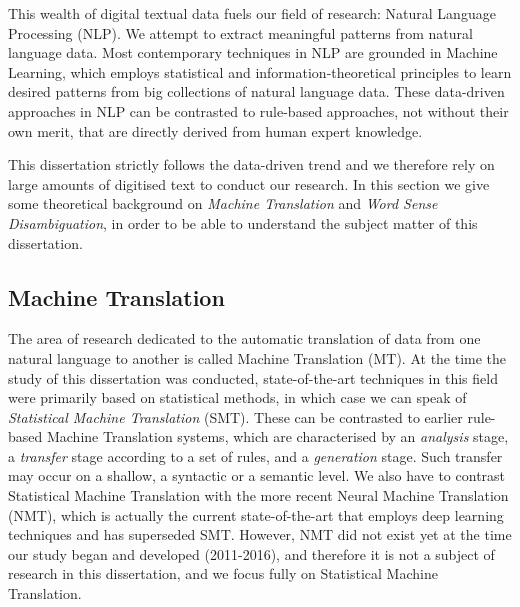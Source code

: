 
This wealth of digital textual data fuels our field of research: Natural Language Processing (NLP). We attempt to
extract meaningful patterns from natural language data.  Most contemporary techniques in NLP are grounded in Machine
Learning, which employs statistical and information-theoretical principles to learn desired patterns from big
collections of natural language data. These data-driven approaches in NLP can be contrasted to rule-based approaches,
not without their own merit, that are directly derived from human expert knowledge.

This dissertation strictly follows the data-driven trend and we therefore rely
on large amounts of digitised text to conduct our research. In this section we
give some theoretical background on \emph{Machine Translation} and \emph{Word
Sense Disambiguation}, in order to be able to understand the subject matter of
this dissertation.

\subsection*{Machine Translation}
\label{sec:intromt}

The area of research dedicated to the automatic translation of data from one natural language to another is called
Machine Translation (MT).  At the time the study of this dissertation was conducted, state-of-the-art techniques in this
field were primarily based on statistical methods, in which case we can speak of \emph{Statistical Machine Translation}
(SMT). These can be contrasted to earlier rule-based Machine Translation systems, which are characterised by an
\emph{analysis} stage, a \emph{transfer} stage according to a set of rules, and a \emph{generation} stage. Such transfer
may occur on a shallow, a syntactic or a semantic level. We also have to contrast Statistical Machine Translation with
the more recent Neural Machine Translation (NMT), which is actually the current state-of-the-art
that employs deep learning techniques and has superseded SMT. However, NMT did not exist yet at the time our study began and developed (2011-2016), and therefore it is not a subject of research in this dissertation, and we focus fully on Statistical Machine Translation.

